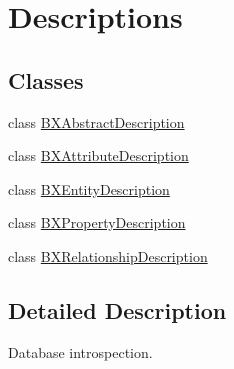 \hypertarget{group__descriptions}{}\section{Descriptions}
\label{group__descriptions}
\subsection*{Classes}
\begin{DoxyCompactItemize}
\item 
class \hyperlink{interface_b_x_abstract_description}{B\+X\+Abstract\+Description}
\item 
class \hyperlink{interface_b_x_attribute_description}{B\+X\+Attribute\+Description}
\item 
class \hyperlink{interface_b_x_entity_description}{B\+X\+Entity\+Description}
\item 
class \hyperlink{interface_b_x_property_description}{B\+X\+Property\+Description}
\item 
class \hyperlink{interface_b_x_relationship_description}{B\+X\+Relationship\+Description}
\end{DoxyCompactItemize}


\subsection{Detailed Description}
Database introspection. 